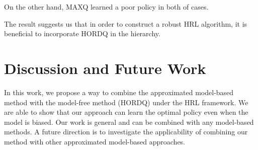 \documentclass{article} %
\begin{document}
On the other hand, MAXQ learned a poor policy in both of cases.  

The result suggests us that in order to construct a robust HRL 
algorithm, it is beneficial to incorporate HORDQ in the hierarchy.



\section{Discussion and Future Work}
In this work, we propose a way to combine the approximated model-based method with the model-free
method (HORDQ) under the HRL framework. We are able to show that our approach can learn the optimal
policy even when the model is biased.  
Our work is general and can be combined with any model-based methods. 
A future direction is to investigate the applicability of combining our method with
other approximated model-based approaches.





{\small


}
\end{document}
